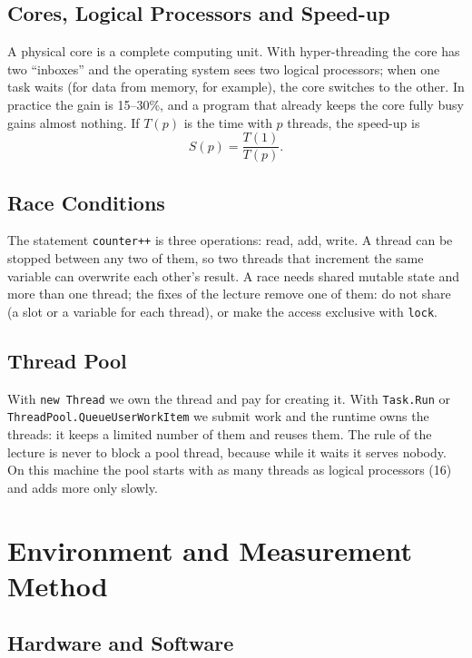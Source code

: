 \documentclass[12pt,a4paper]{article}
\begin{document}
\subsection{Cores, Logical Processors and Speed-up}

A physical core is a complete computing unit. With hyper-threading the core has two ``inboxes'' and the operating system sees two logical processors; when one task waits (for data from memory, for example), the core switches to the other. In practice the gain is 15--30\%, and a program that already keeps the core fully busy gains almost nothing. If $T(p)$ is the time with $p$ threads, the speed-up is
\begin{equation}
  S(p)=\frac{T(1)}{T(p)}.
\end{equation}

\subsection{Race Conditions}

The statement \texttt{counter++} is three operations: read, add, write. A thread can be stopped between any two of them, so two threads that increment the same variable can overwrite each other's result. A race needs shared mutable state and more than one thread; the fixes of the lecture remove one of them: do not share (a slot or a variable for each thread), or make the access exclusive with \texttt{lock}.

\subsection{Thread Pool}

With \texttt{new Thread} we own the thread and pay for creating it. With \texttt{Task.Run} or \texttt{ThreadPool.\allowbreak QueueUserWorkItem} we submit work and the runtime owns the threads: it keeps a limited number of them and reuses them. The rule of the lecture is never to block a pool thread, because while it waits it serves nobody. On this machine the pool starts with as many threads as logical processors (16) and adds more only slowly.

\section{Environment and Measurement Method}

\subsection{Hardware and Software}
\end{document}
